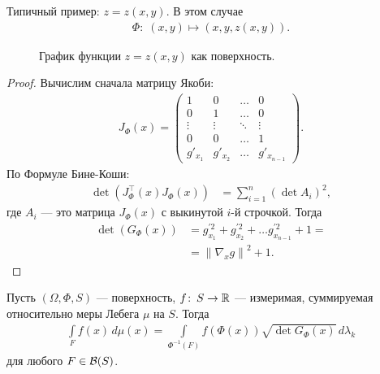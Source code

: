 Типичный пример: $z = z(x, y)$. В этом случае \begin{align*}
 \Phi \colon\; (x, y) \mapsto (x, y, z(x, y))
.\end{align*}

\begin{figure}[ht]
    \centering
    \caption{График функции $z = z(x,y)$ как поверхность.}
    \label{fig:plot_z_x_y}
\end{figure}

\begin{proof}
 Вычислим сначала матрицу Якоби:
 \begin{align*}
  J_{\Phi}(x) = \begin{pmatrix}
   1 & 0 & \ldots & 0 \\
   0 & 1 & \ldots & 0 \\
   \vdots & \vdots & \ddots & \vdots \\
   0 & 0 & \ldots & 1 \\
   g'_{x_1} & g'_{x_2} & \ldots & g'_{x_{n-1}}
  \end{pmatrix}
 .\end{align*} По Формуле Бине-Коши:
 \begin{align*}
  \det(J^{\top}_{\Phi}(x) J_{\Phi}(x)) &= \sum_{i = 1}^{n} \left( \det A_i \right)^{2}
 ,\end{align*} где $A_i$ --- это матрица $J_{\Phi}(x)$ с выкинутой $i$-й строчкой. Тогда
 \begin{align*}
  \det (G_{\Phi}(x)) &= g^{'2}_{x_1} + g^{'2}_{x_2} + \ldots g^{'2}_{x_{n-1}} + 1 = \\ 
  &= \left\| \nabla_x g \right\|^{2} + 1
 .\end{align*} 
\end{proof}
\begin{thm}
 Пусть $(\Omega, \Phi, S)$ --- поверхность, $f \colon\, S \to \mathbb{R} $  --- измеримая, суммируемая относительно меры Лебега $\mu$  на $S$. Тогда
 \begin{align}
  \label{equation:formula_integral_on_surface}
  \int\limits_{F} f(x) \, d\mu(x)  = \int\limits_{\Phi^{-1}(F)} f(\Phi(x)) \sqrt{\det G_{\Phi}(x)} \, d\lambda_k
 \end{align} для любого $F \in \mathcal{B}(S)$.
\end{thm}
